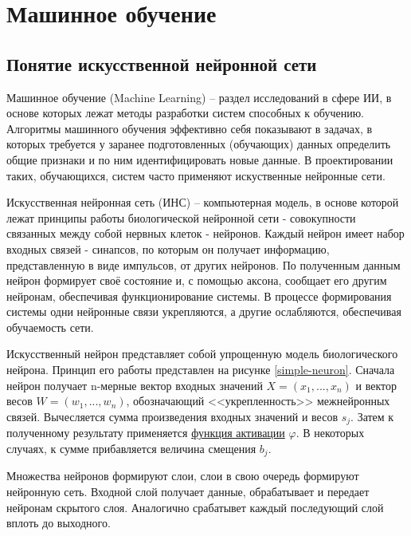 
\section{Машинное обучение}

\subsection{Понятие искусственной нейронной сети}

Машинное обучение (Machine Learning) – раздел исследований в сфере ИИ, в основе которых лежат методы разработки систем способных к обучению. Алгоритмы машинного обучения эффективно себя показывают в задачах, в которых требуется у заранее подготовленных (обучающих) данных определить общие признаки и по ним идентифицировать новые данные. В проектировании таких, обучающихся, систем часто применяют искуственные нейронные сети. 

Искусственная нейронная сеть (ИНС) – компьютерная модель, в основе которой лежат принципы работы биологической нейронной сети - совокупности связанных между собой нервных клеток - нейронов. Каждый нейрон имеет набор входных связей - синапсов, по которым он получает информацию, представленную в виде импульсов, от других нейронов. По полученным данным нейрон формирует своё состояние и, с помощью аксона, сообщает его другим нейронам, обеспечивая функционирование системы. В процессе формирования системы одни нейронные связи укрепляются, а другие ослабляются, обеспечивая обучаемость сети.

Искусственный нейрон представляет собой упрощенную модель биологического нейрона. Принцип его работы представлен на рисунке \ref{simple-neuron}. Сначала нейрон получает n-мерные вектор входных значений $X=(x_{1},...,x_{n})$ и вектор весов $W=(w_{1},...,w_{n})$, обозначающий <<укрепленность>> межнейронных связей. Вычесляется сумма произведения входных значений и весов $s_j$. Затем к полученному результату применяется \hyperref[sec:activation]{функция активации} $\varphi$. В некоторых случаях, к сумме прибавляется величина смещения $b_j$.


Множества нейронов формируют слои, слои в свою очередь формируют нейронную сеть. Входной слой получает данные, обрабатывает и передает нейронам скрытого слоя. Аналогично срабатывет каждый последующий слой вплоть до выходного. 


